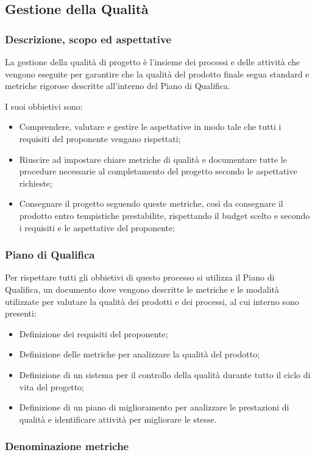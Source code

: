 \pagebreak %
\subsection{Gestione della Qualità}

\subsubsection{Descrizione, scopo ed aspettative}
La gestione della qualità di progetto è l'insieme dei processi e delle attività che vengono eseguite per garantire che la qualità del prodotto finale 
segua standard e metriche rigorose descritte all'interno del Piano di Qualifica.

I suoi obbietivi sono:
\begin{itemize}
    \item Comprendere, valutare e gestire le aspettative in modo tale che tutti i requisiti del proponente vengano rispettati;
    \item Riuscire ad impostare chiare metriche di qualità e documentare tutte le procedure necessarie al completamento del progetto secondo le aspettative richieste;
    \item Consegnare il progetto seguendo queste metriche, così da consegnare il prodotto entro tempistiche prestabilite, rispettando il budget scelto e secondo i requisiti e le aspettative del proponente;
\end{itemize}
\subsubsection{Piano di Qualifica}

Per rispettare tutti gli obbietivi di questo processo si utilizza il Piano di Qualifica, un documento dove vengono descritte le metriche e le modalità utilizzate per valutare la qualità dei prodotti e dei processi, 
al cui interno sono presenti:

\begin{itemize}
    \item Definizione dei requisiti del proponente;
    \item Definizione delle metriche per analizzare la qualità del prodotto;
    \item Definizione di un sistema per il controllo della qualità durante tutto il ciclo di vita del progetto;
    \item Definizione di un piano di miglioramento per analizzare le prestazioni di qualità e identificare attività per migliorare le stesse.
\end{itemize}

\subsubsection{Denominazione metriche}
